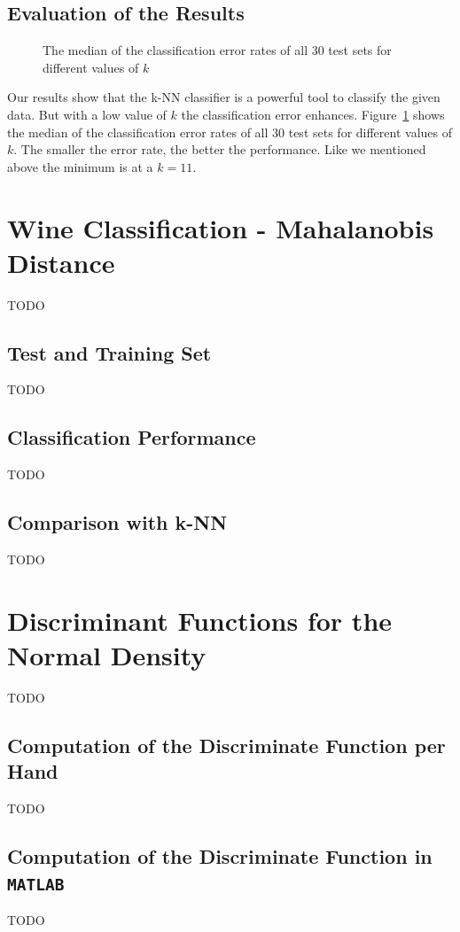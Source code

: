 \documentclass[subfigure,epsfig,fleqn,amssmb,float,caption,ausarbeitung]{scrartcl}
\begin{document}
\subsection{Evaluation of the Results}
\label{sec:kNNResults}

\begin{figure}
	\centering
	\setlength\figureheight{6cm} 
	\setlength\figurewidth{7cm}
	
	\caption{The median of the classification error rates of all 30 test sets for different values of $k$}
	\label{fig:ks}
\end{figure}

Our results show that the k-NN classifier is a powerful tool to classify the 
given data. But with a low value of $k$ the classification error enhances. Figure~\ref{fig:ks} shows the median of the classification error rates of all 30 test sets for different values of $k$. The smaller the error rate, the better the performance. Like we mentioned above the minimum is at a $k=11$.


\section{Wine Classification - Mahalanobis Distance}
\label{sec:Mahalanobis}

TODO


\subsection{Test and Training Set}
\label{sec:MahalanobisTestSet}

TODO


\subsection{Classification Performance}
\label{sec:MahalanobisPerformance}

TODO


\subsection{Comparison with k-NN}
\label{sec:MahalanobisComparison}

TODO


\section{Discriminant Functions for the Normal Density}
\label{sec:DiscriminantFunctions}

TODO


\subsection{Computation of the Discriminate Function per Hand}
\label{sec:Hand}

TODO


\subsection{Computation of the Discriminate Function in \texttt{MATLAB}}
\label{sec:Matlab}

TODO


\pagebreak


\fontsize{9}{10pt}


\end{document}

